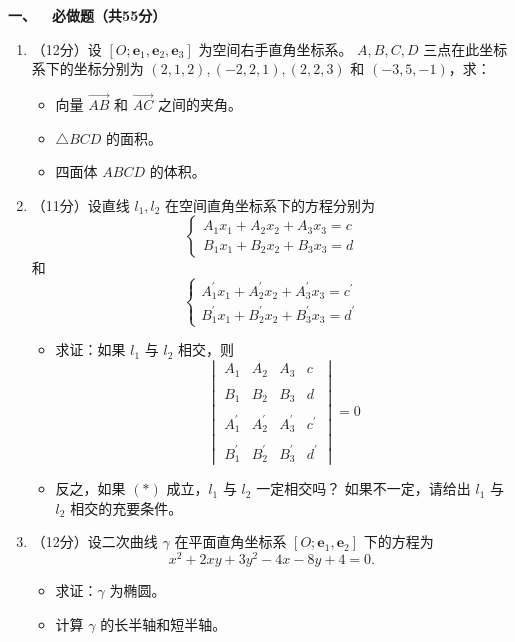 \textbf{一、\ \ 必做题（共55分）}
\begin{enumerate}
\item（12分）设 $[O ; \mathbf{e}_{1}, \mathbf{e}_{2}, \mathbf{e}_{3}]$ 为空间右手直角坐标系。
$A, B, C, D$ 三点在此坐标系下的坐标分别为 $(2,1,2),(-2,2,1),(2,2,3)$ 和 $(-3,5,-1)$，求：
\begin{itemize}
\item[(a)] 向量 $\overrightarrow{AB}$ 和 $\overrightarrow{AC}$ 之间的夹角。
\item[(b)] $\triangle BCD$ 的面积。
\item[(c)] 四面体 $ABCD$ 的体积。
\end{itemize}
\item（11分）设直线 $l_{1}, l_{2}$ 在空间直角坐标系下的方程分别为
$$\begin{cases}
A_{1} x_{1}+A_{2} x_{2}+A_{3} x_{3}=c \\
B_{1} x_{1}+B_{2} x_{2}+B_{3} x_{3}=d
\end{cases}$$
和
$$\begin{cases}
A_{1}^{\prime} x_{1}+A_{2}^{\prime} x_{2}+A_{3}^{\prime} x_{3}=c^{\prime} \\
B_{1}^{\prime} x_{1}+B_{2}^{\prime} x_{2}+B_{3}^{\prime} x_{3}=d^{\prime}
\end{cases}$$
\begin{itemize}
\item[(a)] 求证：如果 $l_{1}$ 与 $l_{2}$ 相交，则
$$\begin{vmatrix}
A_{1} & A_{2} & A_{3} & c \\ \\
B_{1} & B_{2} & B_{3} & d \\ \\
A_{1}^{\prime} & A_{2}^{\prime} & A_{3}^{\prime} & c^{\prime} \\ \\
B_{1}^{\prime} & B_{2}^{\prime} & B_{3}^{\prime} & d^{\prime}
\end{vmatrix}=0\tag{$*$}$$
\item[(b)] 反之，如果 $(*)$ 成立，$l_{1}$ 与 $l_{2}$ 一定相交吗？
如果不一定，请给出 $l_{1}$ 与 $l_{2}$ 相交的充要条件。
\end{itemize}
\item（12分）设二次曲线 $\gamma$ 在平面直角坐标系 $\left[O ; \mathbf{e}_{1}, \mathbf{e}_{2}\right]$ 下的方程为
$$x^{2}+2xy+3y^{2}-4x-8y+4=0.$$
\begin{itemize}
\item[(a)] 求证：$\gamma$ 为椭圆。
\item[(b)] 计算 $\gamma$ 的长半轴和短半轴。

\end{itemize}
\end{enumerate}
